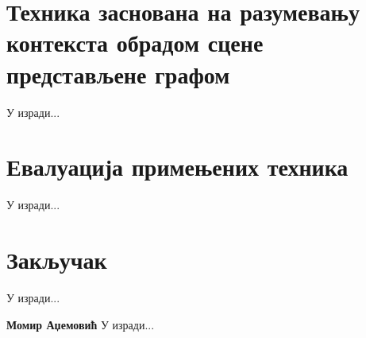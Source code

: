 \documentclass[11pt,oneside]{memoir}
\begin{document}
\chapter{Техника заснована на разумевању контекста обрадом сцене представљене графом}
\label{chp:razrada}

У изради...

\chapter{Евалуација примењених техника}
\label{chp:razrada}

У изради...

\chapter{Закључак}
У изради...

\backmatter




\begin{biografija}
\textbf{Момир Аџемовић} 
У изради...
\end{biografija}
\end{document}
